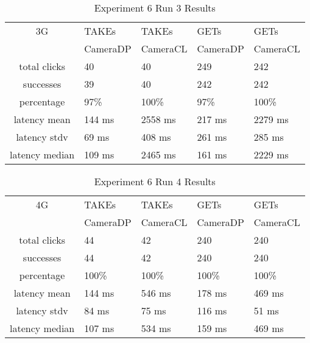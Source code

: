 \begin{table}[htb]
\begin{scriptsize} 
\caption{Experiment 6 Run 3 Results} 
\label{table:exp-6-run3-results}
 \begin{center}
 \begin{tabular}{| c | p{1.5cm} | p{1.5cm} | p{1.5cm} | p{1.4cm} |}
  \hline
  3G & TAKEs & TAKEs & GETs & GETs \\
  & CameraDP & CameraCL & CameraDP & CameraCL \\
  \hline
  total clicks & 40 & 40 & 249 & 242 \\
  \hline
  successes & 39 & 40 & 242 & 242 \\
  \hline
  percentage & 97\% & 100\% & 97\% & 100\% \\
  \hline
  latency mean & 144 ms & 2558 ms & 217 ms & 2279 ms \\
  \hline
  latency stdv & 69 ms & 408 ms & 261 ms & 285 ms \\
  \hline
  latency median & 109 ms & 2465 ms & 161 ms & 2229 ms \\
  \hline
  \end{tabular}

  \end{center}
\end{scriptsize}
\end{table}
\begin{table}[htb]
\begin{scriptsize} 
\caption{Experiment 6 Run 4 Results} 
\label{table:exp-6-run4-results}
 \begin{center}
 \begin{tabular}{| c | p{1.5cm} | p{1.5cm} | p{1.5cm} | p{1.4cm} |}
  \hline
  4G & TAKEs & TAKEs & GETs & GETs \\
  & CameraDP & CameraCL & CameraDP & CameraCL \\
  \hline
  total clicks & 44 & 42 & 240 &  240 \\
  \hline
  successes & 44 & 42 & 240 & 240 \\
  \hline
  percentage & 100\% & 100\% & 100\% & 100\% \\
  \hline
  latency mean & 144 ms & 546 ms & 178 ms & 469 ms \\
  \hline
  latency stdv & 84 ms & 75 ms & 116 ms & 51 ms \\
  \hline
  latency median & 107 ms & 534 ms & 159 ms & 469 ms \\
  \hline
  \end{tabular}
  \end{center}
\end{scriptsize}
\end{table}

